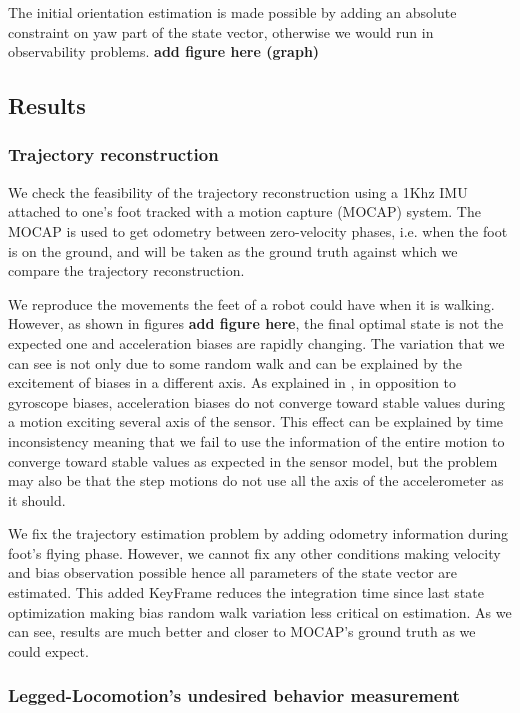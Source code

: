 The initial orientation estimation is made possible by adding an absolute constraint on yaw part of the state vector, otherwise we would run in observability problems. \textbf{add figure here (graph)}

\subsection{Results}
\subsubsection{Trajectory reconstruction}

We check the feasibility of the trajectory reconstruction using a 1Khz IMU attached to one's foot tracked with a motion capture (MOCAP) system. The MOCAP is used to get odometry between zero-velocity phases, i.e. when the foot is on the ground,
and will be taken as the ground truth against which we compare the trajectory reconstruction.

We reproduce the movements the feet of a robot could have when it is walking. However, as shown in figures \textbf{add figure here}, the final optimal state
is not the expected one and acceleration biases are rapidly changing. The variation that we can see is not only due to some random walk and can be explained by the excitement of biases in a different axis.
As explained in \cite{roussillon2011rt}, in opposition to gyroscope biases, acceleration biases do not converge toward stable values during a motion exciting several axis of the sensor. 
This effect can be explained by time inconsistency meaning that we fail
to use the information of the entire motion to converge toward stable values as expected in the sensor model, but the problem may also be that the step motions do not use all the axis of the accelerometer as it should.

We fix the trajectory estimation problem by adding odometry information during foot's flying phase. However, we cannot fix any other conditions making velocity and bias observation possible hence all parameters of the state vector are estimated.
This added KeyFrame reduces the integration time since last state optimization making bias random walk variation less critical on estimation. As we can see, results are much better and closer to MOCAP's ground truth as we could expect.


\subsubsection{Legged-Locomotion's undesired behavior measurement}

